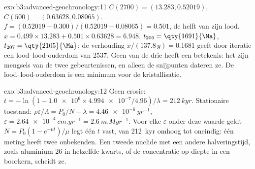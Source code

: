 \begin{solution}{exo:b3:advanced-geochronology:11}
$C(2700) = (13.283, 0.52019)$, $C(500) = (0.63628, 0.08065)$. $f = (0.52019 -
0.300)/(0.52019 - 0.08065) = 0.501$, de helft van zijn lood. $x = 0.499\times13.283 +
0.501\times0.63628 = 6.948$. $t_{206} = \qty{1691}{\Ma}$, $t_{207} =
\qty{2105}{\Ma}$; de verhouding $x/(137.8\,y) = 0.1681$ geeft door iteratie een
lood--lood-ouderdom van \qty{2537}{\Ma}. Geen van de drie heeft een betekenis: het zijn
mengsels van de twee gebeurtenissen, en alleen de snijpunten dateren ze. De
lood--lood-ouderdom is een minimum voor de kristallisatie.
\end{solution}

\begin{solution}{exo:b3:advanced-geochronology:12}
Geen erosie: $t = -\ln(1 - \num{1.0e6}\times\num{4.994e-7}/4.96)/\lambda =
\qty{212}{kyr}$. Stationaire toestand: $\rho\varepsilon/\Lambda = P_0/N - \lambda =
\qty{4.46e-6}{yr^{-1}}$, $\varepsilon = \qty{2.64e-4}{cm.yr^{-1}} =
\qty{2.6}{m.Myr^{-1}}$. Voor elke $\varepsilon$ onder deze waarde geldt $N =
P_0(1 - e^{-\mu t})/\mu$ legt één $t$ vast, van \qty{212}{kyr} omhoog tot
oneindig: één meting heeft twee onbekenden. Een tweede nuclide met een andere
halveringstijd, zoals aluminium-26 in hetzelfde kwarts, of de concentratie op
diepte in een boorkern, scheidt ze.
\end{solution}

